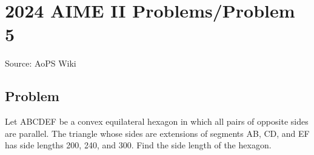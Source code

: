 \documentclass[12pt]{article}
\begin{document}
\section*{{2024 AIME II Problems/Problem 5}}
Source: AoPS Wiki

\subsection*{Problem}
Let ABCDEF be a convex equilateral hexagon in which all pairs of opposite sides are parallel. The triangle whose sides are extensions of segments AB, CD, and EF has side lengths 200, 240, and 300. Find the side length of the hexagon.
\end{document}
